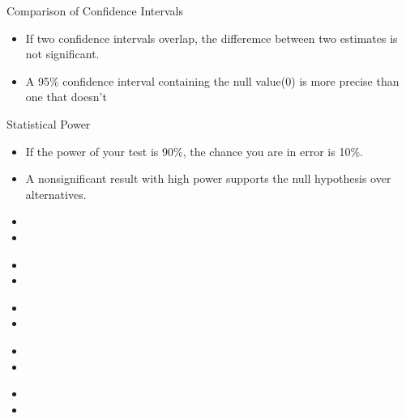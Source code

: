 \documentclass[aspectratio=169, 12pt]{beamer}
\begin{document}
\begin{frame}{Comparison of Confidence Intervals} %
\begin{itemize}
    \item If two confidence intervals overlap, the differemce between two estimates is not significant.
    \item A 95\% confidence interval containing the null value(0) is more precise than one that doesn't
\end{itemize}
\end{frame}

\begin{frame}{Statistical Power} %
\begin{itemize}
    \item If the power of your test is 90\%, the chance you are in error is 10\%.
    \item A nonsignificant result with high power supports the null hypothesis over alternatives.
\end{itemize}
\end{frame}

\begin{frame}{}
\begin{itemize}
    \item
    \item
\end{itemize}
\end{frame}

\begin{frame}{}
\begin{itemize}
    \item
    \item
\end{itemize}
\end{frame}

\begin{frame}{}
\begin{itemize}
    \item
    \item
\end{itemize}
\end{frame}

\begin{frame}{}
\begin{itemize}
    \item
    \item
\end{itemize}
\end{frame}

\begin{frame}{}
\begin{itemize}
    \item
    \item
\end{itemize}
\end{frame}
\end{document}
